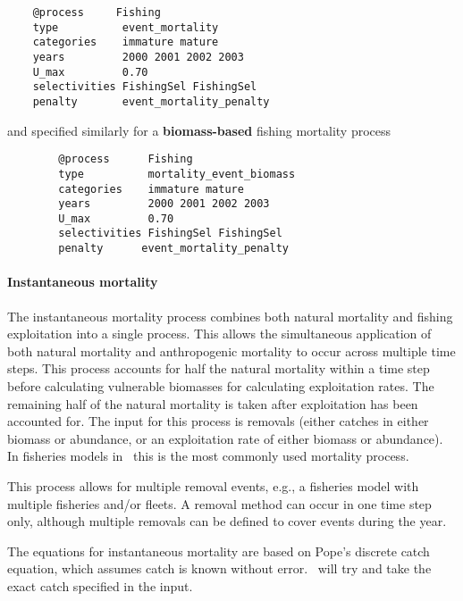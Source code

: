 {\small{\begin{verbatim}
	@process     Fishing
	type          event_mortality
	categories    immature mature
	years         2000 2001 2002 2003
	U_max         0.70
	selectivities FishingSel FishingSel
	penalty       event_mortality_penalty
	\end{verbatim}}}

and specified similarly for a \textbf{biomass-based} fishing mortality process

{\small{\begin{verbatim}
		@process      Fishing
		type          mortality_event_biomass
		categories    immature mature
		years         2000 2001 2002 2003
		U_max         0.70
		selectivities FishingSel FishingSel
		penalty      event_mortality_penalty
		\end{verbatim}}}

\paragraph{Instantaneous mortality}\label{sec:Process-MortalityInstantaneous}

The instantaneous mortality process combines both natural mortality and fishing exploitation into a single process. This allows the simultaneous application of both natural mortality and anthropogenic mortality to occur across multiple time steps. This process accounts for half the natural mortality within a time step before calculating vulnerable biomasses for calculating exploitation rates. The remaining half of the natural mortality is taken after exploitation has been accounted for. The input for this process is removals (either catches in either biomass or abundance, or an exploitation rate of either biomass or abundance). In fisheries models in \CNAME\ this is the most commonly used mortality process.

This process allows for multiple removal events, e.g., a fisheries model with multiple fisheries and/or fleets. A removal method can occur in one time step only, although multiple removals can be defined to cover events during the year.

The equations for instantaneous mortality are based on Pope's discrete catch equation, which assumes catch is known without error. \CNAME\ will try and take the exact catch specified in the input.

